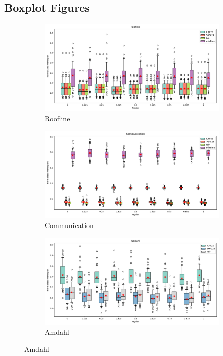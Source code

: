 \documentclass{article}
\begin{document}
\subsection{Boxplot Figures}
\begin{figure}[htbp]
\centering
\begin{subfigure}[b]{0.32\textwidth}\includegraphics[width=\textwidth]{Results/Regular/Regular_Roofline_boxplot}\caption{Roofline}\label{fig:boxplot_figures_Regular_Roofline}\end{subfigure}
\hfill
\begin{subfigure}[b]{0.32\textwidth}\includegraphics[width=\textwidth]{Results/Regular/Regular_Communication_boxplot}\caption{Communication}\label{fig:boxplot_figures_Regular_Communication}\end{subfigure}
\hfill
\begin{subfigure}[b]{0.32\textwidth}\includegraphics[width=\textwidth]{Results/Regular/Regular_Amdahl_boxplot}\caption{Amdahl}\label{fig:boxplot_figures_Regular_Amdahl}\end{subfigure}

\end{figure}
\end{document}
